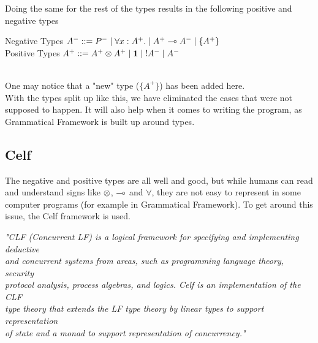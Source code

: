 Doing the same for the rest of the types results in the following positive and negative types
\begin{texto}
Negative Types $A^- ::= P^- \; | \; \forall x:A^+. \; | \; A^+ \multimap A^- \; | \; \{ A^+ \} $\\
Positive Types \hspace{0.8pt} $A^+ ::= A^+ \otimes A^+ \; | \; \mathord{\text{\rm\bf 1}} \; | \; \mathord{\text{\rm !}} A^- \; | \; A^- $
\end{texto}
 \\
One may notice that a "new" type ($\{ A^+ \}$) has been added here.\\
With the types split up like this, we have eliminated the cases that were not supposed to happen. It will also help when it comes to writing the program, as Grammatical Framework is built up around types.

\subsection{Celf}
\label{03_01_03}

The negative and positive types are all well and good, but while humans can read and understand signs like $\otimes$, $\multimap$ and $\forall$, they are not easy to represent in some computer programs (for example in Grammatical Framework). To get around this issue, the Celf framework is used.

\begin{texto}
\textit{"CLF (Concurrent LF) is a logical framework for specifying and implementing deductive \\
and concurrent systems from areas, such as programming language theory, security \\
protocol analysis, process algebras, and logics. Celf is an implementation of the CLF \\
type theory that extends the LF type theory by linear types to support representation \\
of state and a monad to support representation of concurrency."} \cite{Celf}
\end{texto}

